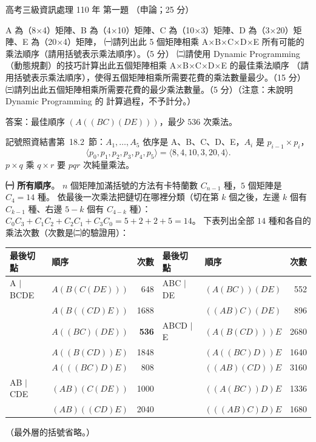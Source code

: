\begin{pastexam}[label={px:gk3-110-ds-01}]{高考三級資訊處理 110 年 第一題}
（申論；25 分）

A 為（8×4）矩陣、B 為（4×10）矩陣、C 為（10×3）矩陣、D 為（3×20）矩陣、E 為（20×4）矩陣，
㈠請列出此 5 個矩陣相乘 A×B×C×D×E 所有可能的乘法順序（請用括號表示乘法順序）。（5 分）
㈡請使用 Dynamic Programming（動態規劃）的技巧計算出此五個矩陣相乘 A×B×C×D×E 的最佳乘法順序
（請用括號表示乘法順序），使得五個矩陣相乘所需要花費的乘法數量最少。（15 分）
㈢請列出此五個矩陣相乘所需要花費的最少乘法數量。（5 分）（注意：未說明 Dynamic Programming 的
計算過程，不予計分。）
\end{pastexam}

\begin{pastsoln}
答案：最佳順序 $(A((BC)(DE)))$，最少 $536$ 次乘法。

記號照資結書第~18.2~節：$A_1, \ldots, A_5$ 依序是 A、B、C、D、E，$A_i$ 是 $p_{i-1} \times p_i$，
\[
\langle p_0, p_1, p_2, p_3, p_4, p_5 \rangle = \langle 8, 4, 10, 3, 20, 4 \rangle .
\]
$p \times q$ 乘 $q \times r$ 要 $pqr$ 次純量乘法。

\textbf{㈠ 所有順序}。 $n$ 個矩陣加滿括號的方法有卡特蘭數 $C_{n-1}$ 種，$5$ 個矩陣是
$C_4 = 14$ 種。 依最後一次乘法把鏈切在哪裡分類（切在第 $k$ 個之後，左邊 $k$ 個有 $C_{k-1}$
種、右邊 $5 - k$ 個有 $C_{4-k}$ 種）：$C_0 C_3 + C_1 C_2 + C_2 C_1 + C_3 C_0 = 5 + 2 + 2 + 5 = 14$。
下表列出全部 $14$ 種和各自的乘法次數（次數是㈡的驗證用）：
\begin{center}
\small
\begin{tabular}{llr@{\qquad}llr}
\toprule
最後切點 & 順序 & 次數 & 最後切點 & 順序 & 次數 \\
\midrule
A $|$ BCDE & $A(B(C(DE)))$ & 648 & ABC $|$ DE & $(A(BC))(DE)$ & 552 \\
 & $A(B((CD)E))$ & 1688 & & $((AB)C)(DE)$ & 896 \\
 & $A((BC)(DE))$ & \textbf{536} & ABCD $|$ E & $(A(B(CD)))E$ & 2680 \\
 & $A((B(CD))E)$ & 1848 & & $(A((BC)D))E$ & 1640 \\
 & $A(((BC)D)E)$ & 808 & & $((AB)(CD))E$ & 3160 \\
AB $|$ CDE & $(AB)(C(DE))$ & 1000 & & $((A(BC))D)E$ & 1336 \\
 & $(AB)((CD)E)$ & 2040 & & $(((AB)C)D)E$ & 1680 \\
\bottomrule
\end{tabular}
\end{center}
（最外層的括號省略。）


\end{pastsoln}
